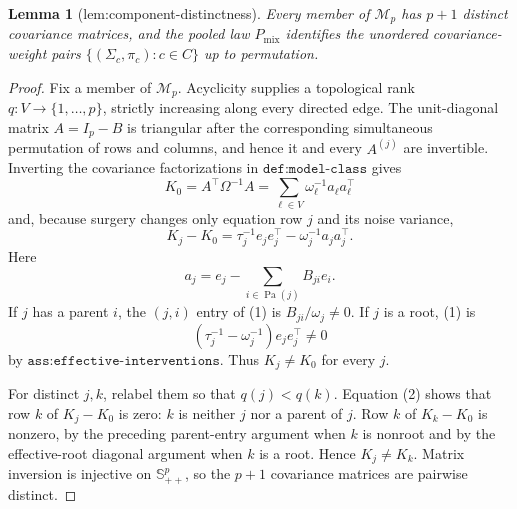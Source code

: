 \documentclass{article}
\newtheorem{lemma}{Lemma}
\begin{document}
\begin{lemma}[lem:component-distinctness]\label{lem:component-distinctness}
Every member of \(\mathcal M_p\) has \(p+1\) distinct covariance matrices, and the pooled law \(P_{\mathrm{mix}}\) identifies the unordered covariance-weight pairs \(\{(\Sigma_c,\pi_c):c\in C\}\) up to permutation.
\end{lemma}
\begin{proof}
Fix a member of \(\mathcal M_p\).  Acyclicity supplies a topological rank
\(q:V\to\{1,\ldots,p\}\), strictly increasing along every directed edge.
The unit-diagonal matrix \(A=I_p-B\) is triangular after the corresponding
simultaneous permutation of rows and columns, and hence it and every
\(A^{(j)}\) are invertible.  Inverting the covariance factorizations in
\(\texttt{def:model-class}\) gives
\[
 K_0=A^{\top}\Omega^{-1}A
     =\sum_{\ell\in V}\omega_\ell^{-1}a_\ell a_\ell^{\top}
\]
and, because surgery changes only equation row \(j\) and its noise variance,
\[
 K_j-K_0
 =\tau_j^{-1}e_je_j^{\top}
  -\omega_j^{-1}a_ja_j^{\top}.                                      \tag{1}
\]
Here
\[
 a_j=e_j-\sum_{i\in\operatorname{Pa}(j)}B_{ji}e_i.                   \tag{2}
\]
If \(j\) has a parent \(i\), the \((j,i)\) entry of (1) is
\(B_{ji}/\omega_j\neq0\).  If \(j\) is a root, (1) is
\[
 (\tau_j^{-1}-\omega_j^{-1})e_je_j^{\top}\neq0
\]
by \(\texttt{ass:effective-interventions}\).  Thus \(K_j\neq K_0\) for
every \(j\).

For distinct \(j,k\), relabel them so that \(q(j)<q(k)\).  Equation (2)
shows that row \(k\) of \(K_j-K_0\) is zero: \(k\) is neither \(j\) nor a
parent of \(j\).  Row \(k\) of \(K_k-K_0\) is nonzero, by the preceding
parent-entry argument when \(k\) is nonroot and by the effective-root
diagonal argument when \(k\) is a root.  Hence \(K_j\neq K_k\).  Matrix
inversion is injective on \(\mathbb S_{++}^p\), so the \(p+1\) covariance
matrices are pairwise distinct.


\end{proof}
\end{document}
